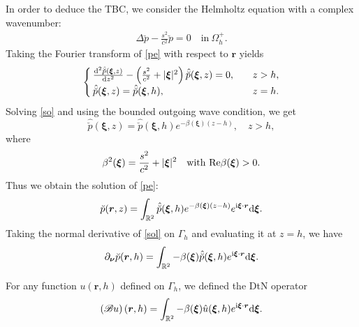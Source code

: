 \documentclass[final,leqno]{siamltex}
\begin{document}
In order to deduce the TBC, we consider the Helmholtz equation with a complex
wavenumber:
\begin{align}\label{pe}
 \Delta \breve {p} -\frac{s^2 }{c^2} \breve p=0 \quad \text {in}~\Omega_h^+.
\end{align}
Taking the Fourier transform of \eqref{pe} with respect to $\boldsymbol r$
yields
\begin{align}\label{so}
\begin{cases}
 \frac{{\rm d}^2 \hat {\breve p} (\boldsymbol \xi, z)}{ {\rm d} z^2}- \left(
\frac{s^2 }{c^2 } + |\boldsymbol \xi|^2\right) \hat {\breve p } (\boldsymbol\xi,
z)=0, \quad &  z>h,\\
 \hat {\breve p} ( \boldsymbol \xi, z) =\hat {\breve p} (\boldsymbol\xi, h),
\quad &z=h.
 \end{cases}
\end{align}
Solving \eqref{so} and using the bounded outgoing wave condition, we get
\[
 \hat {\breve p} (\boldsymbol\xi, z)= \hat{\breve p} (\boldsymbol\xi, h) e^{-
\beta (\boldsymbol\xi) (z-h)}, \quad z >h,
\]
where
\begin{align}\label{B1}
 \beta^2(\boldsymbol \xi) = \frac{s^2 }{c^2 } +|\boldsymbol \xi|^2 \quad\text
{with}~{\rm Re}\beta (\boldsymbol \xi) >0.
\end{align}
Thus we obtain the solution of \eqref{pe}:
\begin{align}\label{sol}
 \breve p (\boldsymbol r, z) = \int_{\mathbb R^2}
 \hat{\breve p} (\boldsymbol \xi,h) e^{- \beta ( \boldsymbol \xi) (z-h)} e^{
{\rm i}\boldsymbol \xi \cdot \boldsymbol r} {\rm d}  \boldsymbol\xi.
\end{align}
Taking the normal derivative of \eqref{sol} on $\Gamma_h$ and evaluating it at
$z=h$, we have
\begin{align*}
 \partial_{\boldsymbol \nu} \breve p (\boldsymbol r, h) =\int_{\mathbb R^2} -
\beta ( \boldsymbol \xi ) \hat  {\breve p}( \boldsymbol \xi, h) e^{{\rm i}
\boldsymbol \xi \cdot  \boldsymbol r} {\rm d } \boldsymbol\xi.
\end{align*}

For any function $u (\boldsymbol r, h)$ defined on $\Gamma_h$, we  defined
the DtN operator
\begin{align}\label{dtn}
 \left(\mathscr{B}  u \right) (\boldsymbol r, h)= \int_{\mathbb R^2} - \beta
(\boldsymbol \xi) \hat  u ( \boldsymbol \xi, h) e^{{\rm i} \boldsymbol \xi \cdot
\boldsymbol r } {\rm d} \boldsymbol \xi.
\end{align}
\end{document}
